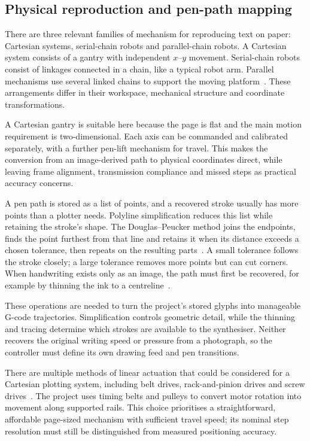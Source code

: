 \subsection{Physical reproduction and pen-path mapping}
There are three relevant families of mechanism for reproducing text on paper: Cartesian systems, serial-chain robots and parallel-chain robots. A Cartesian system consists of a gantry with independent $x$--$y$ movement. Serial-chain robots consist of linkages connected in a chain, like a typical robot arm. Parallel mechanisms use several linked chains to support the moving platform~\cite[pp.~5--8]{teikari2016}. These arrangements differ in their workspace, mechanical structure and coordinate transformations.

A Cartesian gantry is suitable here because the page is flat and the main motion requirement is two-dimensional. Each axis can be commanded and calibrated separately, with a further pen-lift mechanism for travel. This makes the conversion from an image-derived path to physical coordinates direct, while leaving frame alignment, transmission compliance and missed steps as practical accuracy concerns.

A pen path is stored as a list of points, and a recovered stroke usually has more points than a plotter needs. Polyline simplification reduces this list while retaining the stroke's shape. The Douglas--Peucker method joins the endpoints, finds the point furthest from that line and retains it when its distance exceeds a chosen tolerance, then repeats on the resulting parts~\cite{douglas1973}. A small tolerance follows the stroke closely; a large tolerance removes more points but can cut corners. When handwriting exists only as an image, the path must first be recovered, for example by thinning the ink to a centreline~\cite[p.~237]{zhang1984}.

These operations are needed to turn the project's stored glyphs into manageable G-code trajectories. Simplification controls geometric detail, while the thinning and tracing determine which strokes are available to the synthesiser. Neither recovers the original writing speed or pressure from a photograph, so the controller must define its own drawing feed and pen transitions.

There are multiple methods of linear actuation that could be considered for a Cartesian plotting system, including belt drives, rack-and-pinion drives and screw drives~\cite{iqs2024}. The project uses timing belts and pulleys to convert motor rotation into movement along supported rails. This choice prioritises a straightforward, affordable page-sized mechanism with sufficient travel speed; its nominal step resolution must still be distinguished from measured positioning accuracy.

